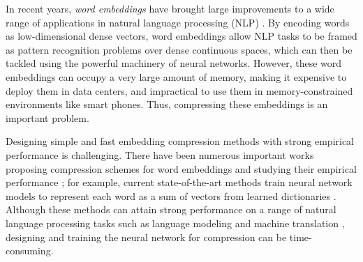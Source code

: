In recent years, \textit{word embeddings} \citep{word2vec13,glove14,fasttext18} have brought large improvements to a wide range of applications in natural language processing (NLP) \citep{collins16,drqa17}.
By encoding words as low-dimensional dense vectors, word embeddings allow NLP tasks to be framed as pattern recognition problems over dense continuous spaces, which can then be tackled using the powerful machinery of neural networks.
However, these word embeddings can occupy a very large amount of memory, making it expensive to deploy them in data centers, and impractical to use them in memory-constrained environments like smart phones.
Thus, compressing these embeddings is an important problem.


Designing simple and fast embedding compression methods with strong empirical performance is challenging.
There have been numerous important works proposing compression schemes for word embeddings and studying their empirical performance \citep{sparse16,andrews16,dccl17,kway18};
for example, current state-of-the-art methods train neural network models to represent each word as a sum of vectors from learned dictionaries \citep{dccl17,kway18}.
Although these methods can attain strong performance on a range of natural language processing tasks such as language modeling \citep{mikolov10} and machine translation \citep{bahdanau15}, designing and training the neural network for compression can be time-consuming.



